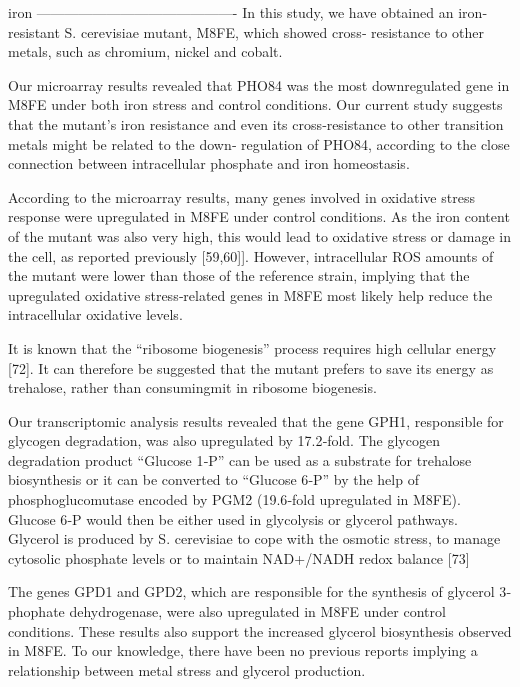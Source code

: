 iron
-------------------------------------------
In this study, we have obtained an iron‐resistant S. cerevisiae mutant, M8FE, which showed cross‐
resistance to other metals, such as chromium, nickel and cobalt.

Our microarray results revealed that PHO84 was the most downregulated gene in M8FE under
both iron stress and control conditions. Our current study suggests that the mutant’s iron
resistance and even its cross‐resistance to other transition metals might be related to the down‐
regulation of PHO84, according to the close connection between intracellular phosphate and iron
homeostasis.

According to the microarray results, many genes involved in oxidative stress response were
upregulated in M8FE under control conditions. As the iron content of the mutant was also very high, this would lead to oxidative stress or damage in the cell, as reported previously [59,60]]. However, intracellular ROS amounts of the mutant were lower than those of the reference strain, implying that the upregulated oxidative stress‐related genes in M8FE most likely help reduce the intracellular oxidative levels.

It is known that the “ribosome biogenesis” process requires high cellular energy [72]. It can therefore be suggested that the mutant prefers to save its energy as trehalose, rather than consumingmit in ribosome biogenesis.

Our transcriptomic analysis results revealed that the gene GPH1, responsible for glycogen degradation, was also upregulated by 17.2‐fold. The glycogen degradation product “Glucose 1‐P” can be used as a substrate for trehalose biosynthesis or it can be converted to “Glucose 6‐P” by the help of phosphoglucomutase encoded by PGM2 (19.6‐fold upregulated in M8FE). Glucose 6‐P would then be either used in glycolysis or glycerol pathways. Glycerol is produced by S. cerevisiae to cope with the osmotic stress, to manage cytosolic phosphate levels or to maintain NAD+/NADH redox balance [73]

The genes GPD1 and GPD2, which are responsible for the synthesis of glycerol 3‐phophate
dehydrogenase, were also upregulated in M8FE under control conditions. These results also support
the increased glycerol biosynthesis observed in M8FE. To our knowledge, there have been no
previous reports implying a relationship between metal stress and glycerol production.


